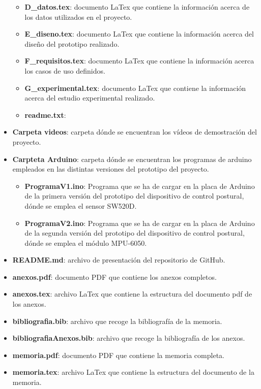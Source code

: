 \begin{itemize}
\begin{itemize}
        \item \textbf{D\_datos.tex}: documento LaTex que contiene la información acerca de los datos utilizados en el proyecto.
        \item \textbf{E\_diseno.tex}: documento LaTex que contiene la información acerca del diseño del prototipo realizado.
        \item \textbf{F\_requisitos.tex}: documento LaTex que contiene la información acerca los casos de uso definidos.
        \item \textbf{G\_experimental.tex}: documento LaTex que contiene la información acerca del estudio experimental realizado.
        \item \textbf{readme.txt}:
    \end{itemize}
    \item \textbf{Carpeta videos}: carpeta dónde se encuentran los vídeos de demostración del proyecto.
    \item \textbf{Carpteta Arduino}: carpeta dónde se encuentran los programas de arduino empleados en las distintas versiones del prototipo del proyecto.
\begin{itemize}
    \item \textbf{ProgramaV1.ino}: Programa que se ha de cargar en la placa de Arduino de la primera versión del prototipo del dispositivo de control postural, dónde se emplea el sensor SW520D.
    \item \textbf{ProgramaV2.ino}: Programa que se ha de cargar en la placa de Arduino de la segunda versión del prototipo del dispositivo de control postural, dónde se emplea el módulo MPU-6050.
\end{itemize}
    
    \item \textbf{README.md}: archivo de presentación del repositorio de GitHub.
    \item \textbf{anexos.pdf}: documento PDF que contiene los anexos completos.
    \item \textbf{anexos.tex}: archivo LaTex que contiene la estructura del documento pdf de los anexos.
    \item \textbf{bibliografia.bib}: archivo que recoge la bibliografía de la memoria.
    \item \textbf{bibliografiaAnexos.bib}: archivo que recoge la bibliografía de los anexos.
    \item \textbf{memoria.pdf}: documento PDF que contiene la memoria completa.
    \item \textbf{memoria.tex}: archivo LaTex que contiene la estructura del documento de la memoria.
\end{itemize}


